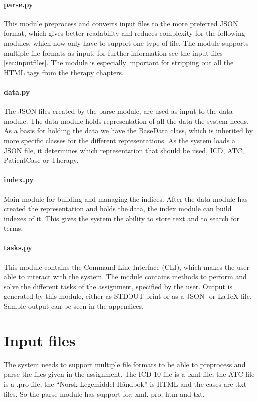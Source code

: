 \paragraph{parse.py}
This module preprocess and converts input files to the more preferred JSON format, which gives better readability and reduces complexity for the following modules, which now only have to support one type of file. The module supports multiple file formats as input, for further information see the input files \autoref{sec:inputfiles}. The module is especially important for stripping out all the HTML tags from the therapy chapters. 

\paragraph{data.py}
The JSON files created by the parse module, are used as input to the data module. The data module holds representation of all the data the system needs. As a basis for holding the data we have the BaseData class, which is inherited by more specific classes for the different representations. As the system loads a JSON file, it determines which representation that should be used, ICD, ATC, PatientCase or Therapy. 

\paragraph{index.py}
Main module for building and managing the indices. After the data module has created the representation and holds the data, the index module can build indexes of it. This gives the system the ability to store text and to search for terms.

\paragraph{tasks.py}
This module contains the Command Line Interface (CLI), which makes the user able to interact with the system. The module contains methods to perform and solve the different tasks of the assignment, specified by the user. Output is generated by this module, either as STDOUT print or as a JSON- or LaTeX-file. Sample output can be seen in the appendices. 


\section{Input files}
\label{sec:inputfiles}
The system needs to support multiple file formats to be able to preprocess and parse the files given in the assignment. The ICD-10 file is a .xml file, the ATC file is a .pro file, the ``Norsk Legemiddel Håndbok'' is HTML and the cases are .txt files. So the parse module has support for: xml, pro, htm and txt. 


